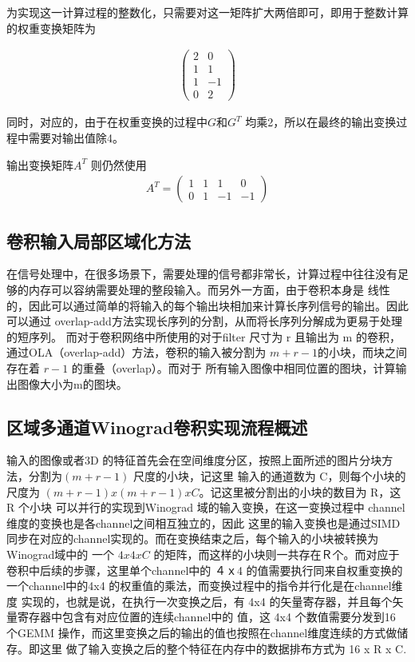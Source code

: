 为实现这一计算过程的整数化，只需要对这一矩阵扩大两倍即可，即用于整数计算的权重变换矩阵为

\begin{align}
  \begin{pmatrix}
    2 & 0\\
    1 & 1\\
    1 & -1\\
    0 & 2
  \end{pmatrix}
\end{align}

同时，对应的，由于在权重变换的过程中$G $和$G^T $ 均乘2，所以在最终的输出变换过程中需要对输出值除4。

输出变换矩阵$A^T$ 则仍然使用
\begin{align}
  A^T = 
  \begin{pmatrix}
    1 & 1 & 1 & 0 \\
    0 & 1 & -1 & -1
  \end{pmatrix}
\end{align}


\subsection{卷积输入局部区域化方法}
在信号处理中，在很多场景下，需要处理的信号都非常长，计算过程中往往没有足够的内存可以容纳需要处理的整段输入。而另外一方面，由于卷积本身是
线性的，因此可以通过简单的将输入的每个输出块相加来计算长序列信号的输出。因此可以通过 overlap-add方法实现长序列的分割，从而将长序列分解成为更易于处理的短序列。
而对于卷积网络中所使用的对于filter 尺寸为 r 且输出为 m 的卷积，通过OLA（overlap-add）方法，卷积的输入被分割为 $m + r - 1$的小块，而块之间存在着 $r-1$ 的重叠（overlap）。而对于
所有输入图像中相同位置的图块，计算输出图像大小为m的图块。


\subsection{区域多通道Winograd卷积实现流程概述}

输入的图像或者3D 的特征首先会在空间维度分区，按照上面所述的图片分块方法，分割为$(m+r-1)$ 尺度的小块，记这里
输入的通道数为 C，则每个小块的尺度为 $ (m+r-1) x (m+r-1) x C $。记这里被分割出的小块的数目为 R，这 R 个小块
可以并行的实现到Winograd 域的输入变换，在这一变换过程中 channel维度的变换也是各channel之间相互独立的，因此
这里的输入变换也是通过SIMD 同步在对应的channel实现的。而在变换结束之后，每个输入的小块被转换为Winograd域中的
一个 $ 4 x 4 x C $ 的矩阵，而这样的小块则一共存在Ｒ个。而对应于卷积中后续的步骤，这里单个channel中的
４ｘ4 的值需要执行同来自权重变换的 一个channel中的4x4 的权重值的乘法，而变换过程中的指令并行化是在channel维度
实现的，也就是说，在执行一次变换之后，有 4x4 的矢量寄存器，并且每个矢量寄存器中包含有对应位置的连续channel中的
值，这 4x4 个数值需要分发到16 个GEMM 操作，而这里变换之后的输出的值也按照在channel维度连续的方式做储存。即这里
做了输入变换之后的整个特征在内存中的数据排布方式为 16 x R x C. 

